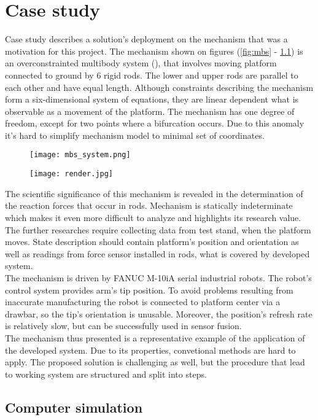 \chapter{Case study}


Case study describes a solution's deployment on the mechanism that was a motivation for this project. The mechanism shown on figures (\ref{fig:mbs} - \ref{fig:render}) is an overconstrainted multibody system (\cite{bib:BPAS2012}), that involves moving platform connected to ground by 6 rigid rods. The lower and upper rods are parallel to each other and have equal length. Although constraints describing the mechanism form a six-dimensional system of equations, they are linear dependent what is observable as a movement of the platform. The mechanism has one degree of freedom, except for two points where a bifurcation occurs. Due to this anomaly it's hard to simplify mechanism model to minimal set of coordinates.

\begin{figure}[!h]
	\centering
	\begin{minipage}{.5\textwidth}
		\centering
		\texttt{[image: mbs\_system.png]}
		\label{fig:mbs}
	\end{minipage}%
	\begin{minipage}{.5\textwidth}
		\centering
		\texttt{[image: render.jpg]}
		\label{fig:render}
	\end{minipage}
\end{figure}

The scientific significance of this mechanism is revealed in the determination of the reaction forces that occur in rods. Mechanism is statically indeterminate which makes it even more difficult to analyze and highlights its research value. The further researches require collecting data from test stand, when the platform moves. State description should contain platform's position and orientation as well as readings from force sensor installed in rods, what is covered by developed system.\\

The mechanism is driven by FANUC M-10iA serial industrial robots. The robot's control system provides arm's tip position. To avoid problems resulting from inaccurate manufacturing the robot is connected to platform center via a drawbar, so the tip's orientation is unusable. Moreover, the position's refresh rate is relatively slow, but can be successfully used in sensor fusion.\\

The mechanism thus presented is a representative example of the application of the developed system. Due to its properties, convetional methods are hard to apply. The proposed solution is challenging as well, but the procedure that lead to working system are structured and split into steps. 

\section{Computer simulation}

